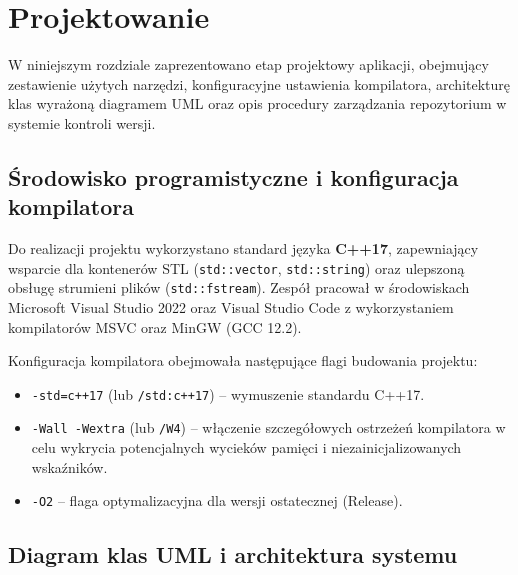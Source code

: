 \newpage
\section{Projektowanie}		%

\hspace{0.60cm}
W niniejszym rozdziale zaprezentowano etap projektowy aplikacji, obejmujący zestawienie użytych narzędzi, konfiguracyjne ustawienia kompilatora, architekturę klas wyrażoną diagramem UML oraz opis procedury zarządzania repozytorium w systemie kontroli wersji.

\subsection{Środowisko programistyczne i konfiguracja kompilatora}

\hspace{0.60cm}
Do realizacji projektu wykorzystano standard języka \textbf{C++17}, zapewniający wsparcie dla kontenerów STL (\texttt{std::vector}, \texttt{std::string}) oraz ulepszoną obsługę strumieni plików (\texttt{std::fstream}). Zespół pracował w środowiskach Microsoft Visual Studio 2022 oraz Visual Studio Code z wykorzystaniem kompilatorów MSVC oraz MinGW (GCC 12.2).

\hspace{0.60cm}
Konfiguracja kompilatora obejmowała następujące flagi budowania projektu:
\begin{itemize}
    \item \texttt{-std=c++17} (lub \texttt{/std:c++17}) -- wymuszenie standardu C++17.
    \item \texttt{-Wall -Wextra} (lub \texttt{/W4}) -- włączenie szczegółowych ostrzeżeń kompilatora w celu wykrycia potencjalnych wycieków pamięci i niezainicjalizowanych wskaźników.
    \item \texttt{-O2} -- flaga optymalizacyjna dla wersji ostatecznej (Release).
\end{itemize}

\subsection{Diagram klas UML i architektura systemu}

